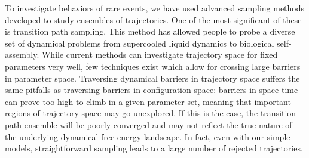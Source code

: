 \documentclass[11pt]{article}
\begin{document}

To investigate behaviors of rare events, we have used advanced sampling methods developed to study ensembles of trajectories. One of the most significant of these is transition path sampling. %
This method has allowed people to probe a diverse set of dynamical problems from supercooled liquid dynamics %
to biological self-assembly. %
While current methods can investigate trajectory space for fixed parameters very well, few techniques exist which allow for crossing large barriers in parameter space. Traversing dynamical barriers in trajectory space suffers the same pitfalls as traversing barriers in configuration space: barriers in space-time can prove too high to climb in a given parameter set, meaning that important regions of trajectory space may go unexplored.  If this is the case, the transition path ensemble will be poorly converged and may not reflect the true nature of the underlying dynamical free energy landscape. In fact, even with our simple models, straightforward sampling leads to a large number of rejected trajectories.

\end{document}
